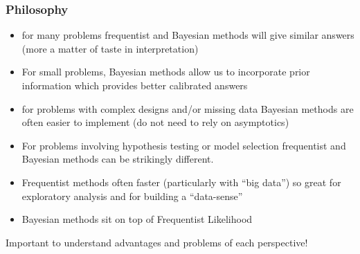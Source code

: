 \documentclass[]{beamer}
\begin{document}
\begin{frame}
  \frametitle{Philosophy}
  \begin{itemize}
\item for many problems frequentist and Bayesian methods will give
  similar answers (more a matter of taste in interpretation)
  \item For small problems, Bayesian methods allow us to incorporate
    prior information which provides better calibrated answers
  \item for problems with complex designs and/or missing data Bayesian
    methods are often easier to implement (do not need to rely
    on asymptotics)
\item For problems involving hypothesis testing or model selection
  frequentist and Bayesian methods can be strikingly different.
\item Frequentist methods often faster (particularly with ``big
  data'') so great for exploratory analysis and for building a
  ``data-sense''
\item Bayesian methods sit on top of Frequentist Likelihood
  \end{itemize}
Important to understand advantages and problems of each perspective!
\end{frame}
\end{document}
